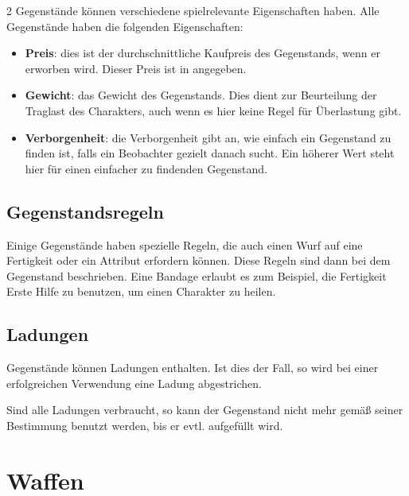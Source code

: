 \begin{multicols}{2}
Gegenstände können verschiedene spielrelevante Eigenschaften haben. Alle Gegenstände haben die folgenden Eigenschaften:
\begin{itemize}
    \item \textbf{Preis}: dies ist der durchschnittliche Kaufpreis des Gegenstands, wenn er erworben wird. Dieser Preis ist in  angegeben.
    \item \textbf{Gewicht}: das Gewicht des Gegenstands. Dies dient zur Beurteilung der Traglast des Charakters, auch wenn es hier keine Regel für Überlastung gibt.
    \item \textbf{Verborgenheit}: die Verborgenheit gibt an, wie einfach ein Gegenstand zu finden ist, falls ein Beobachter gezielt danach sucht. Ein höherer Wert steht hier für einen einfacher zu findenden Gegenstand.
\end{itemize}


\subsection{Gegenstandsregeln}

Einige Gegenstände haben spezielle Regeln, die auch einen Wurf auf eine Fertigkeit oder ein Attribut erfordern können. Diese Regeln sind dann bei dem Gegenstand beschrieben. Eine Bandage erlaubt es zum Beispiel, die Fertigkeit Erste Hilfe zu benutzen, um einen Charakter zu heilen.

\subsection{Ladungen}

Gegenstände können Ladungen enthalten. Ist dies der Fall, so wird bei einer erfolgreichen Verwendung eine Ladung abgestrichen.


Sind alle Ladungen verbraucht, so kann der Gegenstand nicht mehr gemäß seiner Bestimmung benutzt werden, bis er evtl. aufgefüllt wird.

\section{Waffen}


\end{multicols}
